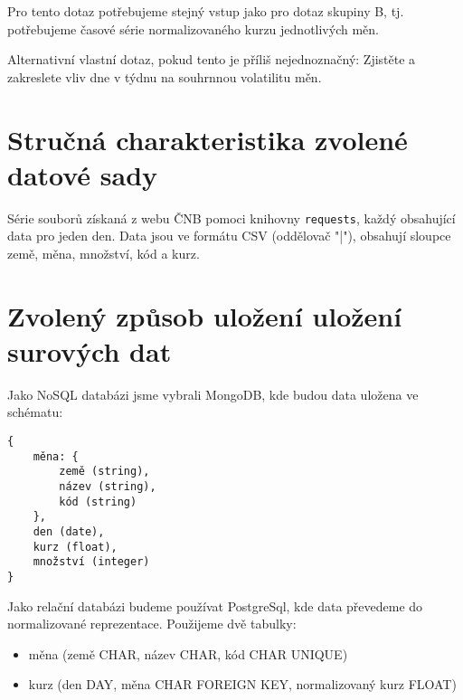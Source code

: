 \documentclass{article}
\begin{document}
Pro tento dotaz potřebujeme stejný vstup jako pro dotaz skupiny B, tj. potřebujeme časové série normalizovaného kurzu jednotlivých měn.

Alternativní vlastní dotaz, pokud tento je příliš nejednoznačný: Zjistěte a zakreslete vliv dne v týdnu na souhrnnou volatilitu měn.

\section{Stručná charakteristika zvolené datové sady}
Série souborů získaná z webu ČNB pomoci knihovny \texttt{requests}, každý obsahující data pro jeden den. Data jsou ve formátu CSV (oddělovač "|"), obsahují sloupce země, měna, množství, kód a kurz.

\section{Zvolený způsob uložení uložení surových dat}
Jako NoSQL databázi jsme vybrali MongoDB, kde budou data uložena ve schématu:
\begin{verbatim}
{
    měna: {
        země (string),
        název (string),
        kód (string)
    },
    den (date),
    kurz (float),
    množství (integer)
}
\end{verbatim}

Jako relační databázi budeme používat PostgreSql, kde data převedeme do normalizované reprezentace. Použijeme dvě tabulky:
\begin{itemize}
    \item měna (země CHAR, název CHAR, kód CHAR UNIQUE)
    \item kurz (den DAY, měna CHAR FOREIGN KEY, normalizovaný kurz FLOAT)
\end{itemize}
\end{document}
